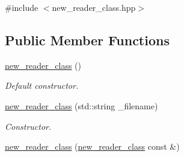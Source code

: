 {\ttfamily \#include $<$new\_\-reader\_\-class.hpp$>$}\subsection*{Public Member Functions}
\begin{DoxyCompactItemize}
\item 
\hypertarget{classnew__reader__class_ad011d88e27ee32447cd2427f526cc272}{
\hyperlink{classnew__reader__class_ad011d88e27ee32447cd2427f526cc272}{new\_\-reader\_\-class} ()}
\label{classnew__reader__class_ad011d88e27ee32447cd2427f526cc272}

\begin{DoxyCompactList}\small\item\em Default constructor. \item\end{DoxyCompactList}\item 
\hypertarget{classnew__reader__class_ad6c890b1812ba8191058350201e90059}{
\hyperlink{classnew__reader__class_ad6c890b1812ba8191058350201e90059}{new\_\-reader\_\-class} (std::string \_\-filename)}
\label{classnew__reader__class_ad6c890b1812ba8191058350201e90059}

\begin{DoxyCompactList}\small\item\em Constructor. \item\end{DoxyCompactList}\item 
\hypertarget{classnew__reader__class_ab07f8c95e1ce24bcf96bb875b80e0f54}{
\hyperlink{classnew__reader__class_ab07f8c95e1ce24bcf96bb875b80e0f54}{new\_\-reader\_\-class} (\hyperlink{classnew__reader__class}{new\_\-reader\_\-class} const \&)}
\label{classnew__reader__class_ab07f8c95e1ce24bcf96bb875b80e0f54}


\end{DoxyCompactItemize}
